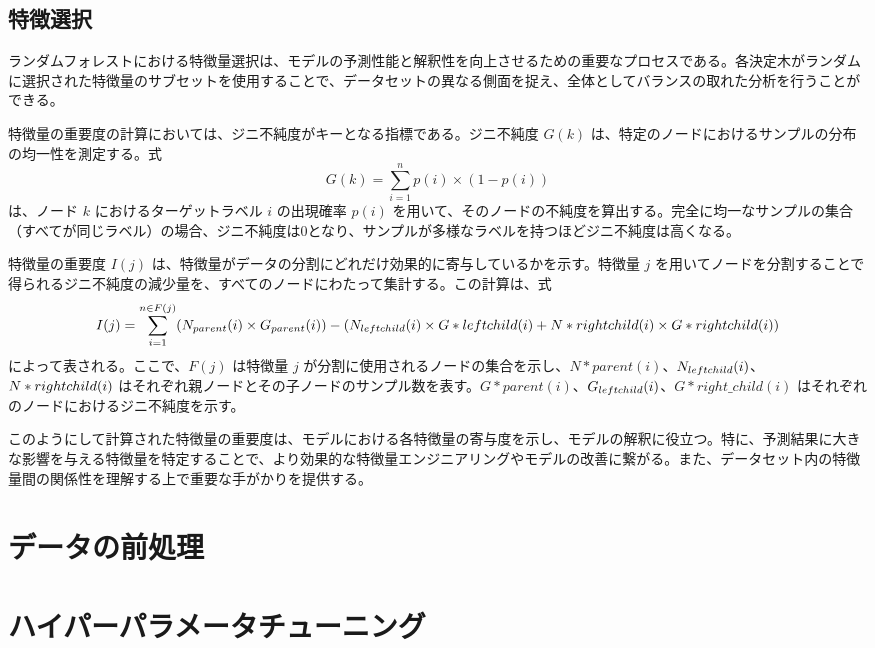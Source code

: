 \documentclass[platex]{suribt}
\begin{document}
\subsection{特徴選択}
ランダムフォレストにおける特徴量選択は、モデルの予測性能と解釈性を向上させるための重要なプロセスである。各決定木がランダムに選択された特徴量のサブセットを使用することで、データセットの異なる側面を捉え、全体としてバランスの取れた分析を行うことができる。

特徴量の重要度の計算においては、ジニ不純度がキーとなる指標である。ジニ不純度 \( G(k) \) は、特定のノードにおけるサンプルの分布の均一性を測定する。式
\begin{equation}
G(k) = \sum_{i=1}^{n} p(i) \times (1-p(i))
\end{equation}
は、ノード \( k \) におけるターゲットラベル \( i \) の出現確率 \( p(i) \) を用いて、そのノードの不純度を算出する。完全に均一なサンプルの集合（すべてが同じラベル）の場合、ジニ不純度は0となり、サンプルが多様なラベルを持つほどジニ不純度は高くなる。

特徴量の重要度 \( I(j) \) は、特徴量がデータの分割にどれだけ効果的に寄与しているかを示す。特徴量 \( j \) を用いてノードを分割することで得られるジニ不純度の減少量を、すべてのノードにわたって集計する。この計算は、式
\begin{equation}
I(j) = \sum_{i=1}^{n \in F(j)} (N_{parent}(i) \times G_{parent}(i)) - (N_{left\*child}(i) \times G*{left\*child}(i) + N*{right\*child}(i) \times G*{right\*child}(i))
\end{equation}
によって表される。ここで、\( F(j) \) は特徴量 \( j \) が分割に使用されるノードの集合を示し、\( N*{parent}(i) \)、\( N_{left\*child}(i) \)、\( N*{right\*child}(i) \) はそれぞれ親ノードとその子ノードのサンプル数を表す。\( G*{parent}(i) \)、\( G_{left\*child}(i) \)、\( G*{right\_child}(i) \) はそれぞれのノードにおけるジニ不純度を示す。

このようにして計算された特徴量の重要度は、モデルにおける各特徴量の寄与度を示し、モデルの解釈に役立つ。特に、予測結果に大きな影響を与える特徴量を特定することで、より効果的な特徴量エンジニアリングやモデルの改善に繋がる。また、データセット内の特徴量間の関係性を理解する上で重要な手がかりを提供する。
\section{データの前処理}
\section{ハイパーパラメータチューニング}
\end{document}
